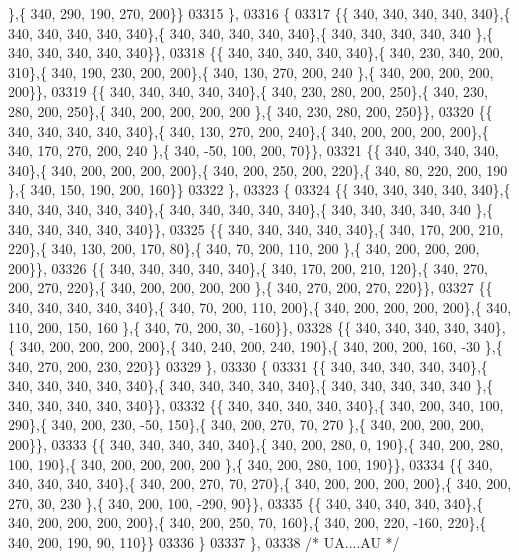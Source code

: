 \begin{DoxyCode}
      \},\{ 340, 290, 190, 270, 200\}\}
03315 \},
03316 \{
03317 \{\{ 340, 340, 340, 340, 340\},\{ 340, 340, 340, 340, 340\},\{ 340, 340, 340, 340, 340\},\{ 340, 340, 340, 340, 340
      \},\{ 340, 340, 340, 340, 340\}\},
03318 \{\{ 340, 340, 340, 340, 340\},\{ 340, 230, 340, 200, 310\},\{ 340, 190, 230, 200, 200\},\{ 340, 130, 270, 200, 240
      \},\{ 340, 200, 200, 200, 200\}\},
03319 \{\{ 340, 340, 340, 340, 340\},\{ 340, 230, 280, 200, 250\},\{ 340, 230, 280, 200, 250\},\{ 340, 200, 200, 200, 200
      \},\{ 340, 230, 280, 200, 250\}\},
03320 \{\{ 340, 340, 340, 340, 340\},\{ 340, 130, 270, 200, 240\},\{ 340, 200, 200, 200, 200\},\{ 340, 170, 270, 200, 240
      \},\{ 340, -50, 100, 200,  70\}\},
03321 \{\{ 340, 340, 340, 340, 340\},\{ 340, 200, 200, 200, 200\},\{ 340, 200, 250, 200, 220\},\{ 340,  80, 220, 200, 190
      \},\{ 340, 150, 190, 200, 160\}\}
03322 \},
03323 \{
03324 \{\{ 340, 340, 340, 340, 340\},\{ 340, 340, 340, 340, 340\},\{ 340, 340, 340, 340, 340\},\{ 340, 340, 340, 340, 340
      \},\{ 340, 340, 340, 340, 340\}\},
03325 \{\{ 340, 340, 340, 340, 340\},\{ 340, 170, 200, 210, 220\},\{ 340, 130, 200, 170,  80\},\{ 340,  70, 200, 110, 200
      \},\{ 340, 200, 200, 200, 200\}\},
03326 \{\{ 340, 340, 340, 340, 340\},\{ 340, 170, 200, 210, 120\},\{ 340, 270, 200, 270, 220\},\{ 340, 200, 200, 200, 200
      \},\{ 340, 270, 200, 270, 220\}\},
03327 \{\{ 340, 340, 340, 340, 340\},\{ 340,  70, 200, 110, 200\},\{ 340, 200, 200, 200, 200\},\{ 340, 110, 200, 150, 160
      \},\{ 340,  70, 200,  30, -160\}\},
03328 \{\{ 340, 340, 340, 340, 340\},\{ 340, 200, 200, 200, 200\},\{ 340, 240, 200, 240, 190\},\{ 340, 200, 200, 160, -30
      \},\{ 340, 270, 200, 230, 220\}\}
03329 \},
03330 \{
03331 \{\{ 340, 340, 340, 340, 340\},\{ 340, 340, 340, 340, 340\},\{ 340, 340, 340, 340, 340\},\{ 340, 340, 340, 340, 340
      \},\{ 340, 340, 340, 340, 340\}\},
03332 \{\{ 340, 340, 340, 340, 340\},\{ 340, 200, 340, 100, 290\},\{ 340, 200, 230, -50, 150\},\{ 340, 200, 270,  70, 270
      \},\{ 340, 200, 200, 200, 200\}\},
03333 \{\{ 340, 340, 340, 340, 340\},\{ 340, 200, 280,   0, 190\},\{ 340, 200, 280, 100, 190\},\{ 340, 200, 200, 200, 200
      \},\{ 340, 200, 280, 100, 190\}\},
03334 \{\{ 340, 340, 340, 340, 340\},\{ 340, 200, 270,  70, 270\},\{ 340, 200, 200, 200, 200\},\{ 340, 200, 270,  30, 230
      \},\{ 340, 200, 100, -290,  90\}\},
03335 \{\{ 340, 340, 340, 340, 340\},\{ 340, 200, 200, 200, 200\},\{ 340, 200, 250,  70, 160\},\{ 340, 200, 220, -160, 
      220\},\{ 340, 200, 190,  90, 110\}\}
03336 \}
03337 \},
03338 \textcolor{comment}{/* UA....AU */}

\end{DoxyCode}
